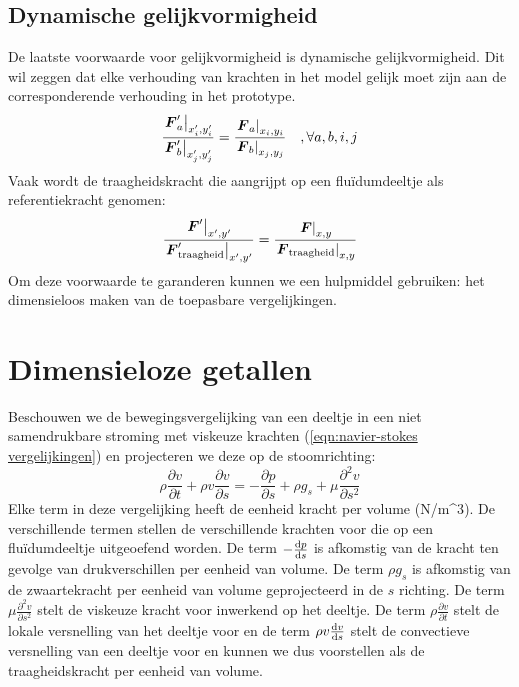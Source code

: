 	\subsection{Dynamische gelijkvormigheid}
De laatste voorwaarde voor gelijkvormigheid is dynamische gelijkvormigheid. Dit wil zeggen dat elke verhouding van krachten in het model gelijk moet zijn aan de corresponderende verhouding in het prototype.
\begin{equation}
	\dfrac{\left. \boldsymbol{F}'_a \right|_{x_i',y_i'}}{\left. \boldsymbol{F}'_b \right|_{x_j',y_j'}} = \dfrac{\left. \boldsymbol{F}_a \right|_{x_i,y_i}}{\left. \boldsymbol{F}_b \right|_{x_j,y_j}} \quad, \forall a,b,i,j
	\label{eqn:dynamische gelijkvormigheid}
\end{equation}
Vaak wordt de traagheidskracht die aangrijpt op een fluïdumdeeltje als referentiekracht genomen:
\begin{equation}
	\dfrac{\left. \boldsymbol{F}' \right|_{x',y'}}{\left. \boldsymbol{F}'_{\text{traagheid}} \right|_{x',y'}} = \dfrac{\left. \boldsymbol{F} \right|_{x,y}}{\left. \boldsymbol{F}_{\text{traagheid}} \right|_{x,y}}
	\label{eqn:dynamische gelijkvormigheid traagheid}
\end{equation}
Om deze voorwaarde te garanderen kunnen we een hulpmiddel gebruiken: het dimensieloos maken van de toepasbare vergelijkingen.

	\section{Dimensieloze getallen}
Beschouwen we de bewegingsvergelijking van een deeltje in een niet samendrukbare stroming met viskeuze krachten (\ref{eqn:navier-stokes vergelijkingen}) en projecteren we deze op de stoomrichting:
\begin{equation}
	\rho \frac{\partial v}{\partial t} + \rho v \frac{\partial v}{\partial s} = -\frac{\partial p}{\partial s} + \rho g_s + \mu \frac{\partial^2 v}{\partial s^2}
	\label{eqn:navier-stokes geprojecteerd}
\end{equation}
Elke term in deze vergelijking heeft de eenheid kracht per volume (\unit{}{N/m^3}). De verschillende termen stellen de verschillende krachten voor die op een fluïdumdeeltje uitgeoefend worden. De term $-\frac{\mathrm{d} p}{\mathrm{d} s}$ is afkomstig van de kracht ten gevolge van drukverschillen per eenheid van volume. De term $\rho g_s$ is afkomstig van de zwaartekracht per eenheid van volume geprojecteerd in de $s$ richting. De term $\mu \frac{\partial^2 v}{\partial s^2}$ stelt de viskeuze kracht voor inwerkend op het deeltje. De term $\rho \frac{\partial v}{\partial t}$ stelt de lokale versnelling van het deeltje voor en de term $\rho v \frac{\mathrm{d} v}{\mathrm{d} s}$ stelt de convectieve versnelling van een deeltje voor en kunnen we dus voorstellen als de traagheidskracht per eenheid van volume.

